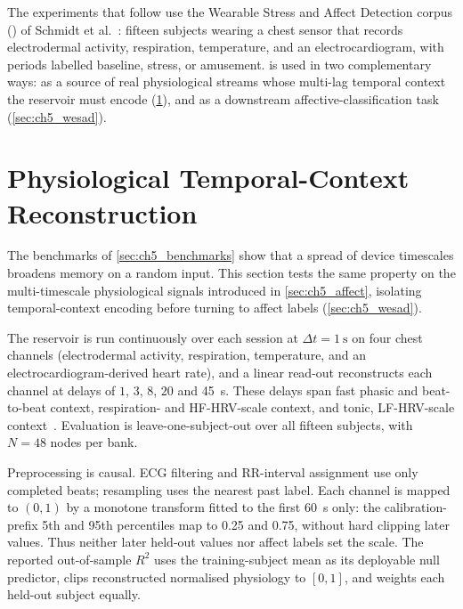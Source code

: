 \documentclass[12pt, twoside]{report}
\begin{document}
The experiments that follow use the Wearable Stress and Affect Detection corpus (\WESAD{}) of Schmidt et al.\ \cite{Schmidt2018WESAD}: fifteen subjects wearing a chest sensor that records electrodermal activity, respiration, temperature, and an electrocardiogram, with periods labelled baseline, stress, or amusement. \WESAD{} is used in two complementary ways: as a source of real physiological streams whose multi-lag temporal context the reservoir must encode (\cref{sec:ch5_physio}), and as a downstream affective-classification task (\cref{sec:ch5_wesad}).

\section{Physiological Temporal-Context Reconstruction}\label{sec:ch5_physio}

The benchmarks of \cref{sec:ch5_benchmarks} show that a spread of device timescales broadens memory on a random input. This section tests the same property on the multi-timescale physiological signals introduced in \cref{sec:ch5_affect}, isolating temporal-context encoding before turning to affect labels (\cref{sec:ch5_wesad}).

The reservoir is run continuously over each \WESAD{} session at $\Delta t = \SI{1}{\second}$ on four chest channels (electrodermal activity, respiration, temperature, and an electrocardiogram-derived heart rate), and a linear read-out reconstructs each channel at delays of $1$, $3$, $8$, $20$ and \SI{45}{\second}. These delays span fast phasic and beat-to-beat context, respiration- and HF-HRV-scale context, and tonic, LF-HRV-scale context~\cite{Boucsein2012EDA,TaskForce1996HRV}. Evaluation is leave-one-subject-out over all fifteen subjects, with $N=48$ nodes per bank.

Preprocessing is causal. ECG filtering and RR-interval assignment use only completed beats; resampling uses the nearest past label. Each channel is mapped to $(0,1)$ by a monotone transform fitted to the first \SI{60}{\second} only: the calibration-prefix 5th and 95th percentiles map to 0.25 and 0.75, without hard clipping later values. Thus neither later held-out values nor affect labels set the scale. The reported out-of-sample $R^2$ uses the training-subject mean as its deployable null predictor, clips reconstructed normalised physiology to $[0,1]$, and weights each held-out subject equally.
\end{document}

